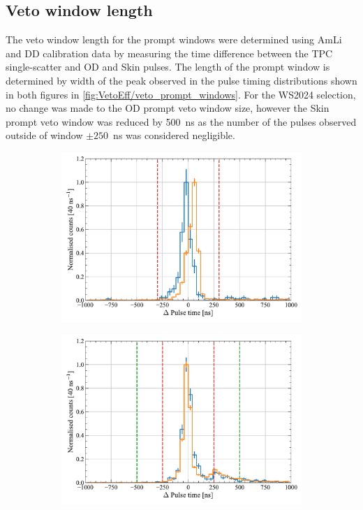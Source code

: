 \subsection{Veto window length}
The veto window length for the prompt windows were determined using AmLi and DD calibration data by measuring the time difference between the TPC single-scatter and OD and Skin pulses. The length of the prompt window is determined by width of the peak observed in the pulse timing distributions shown in both figures in \autoref{fig:VetoEff/veto_prompt_windows}. For the WS2024 selection, no change was made to the OD prompt veto window size, however the Skin prompt veto window was reduced by 500~ns as the number of the pulses observed outside of window $\pm250$~ns was considered negligible.
\begin{figure}[!ht]
	\centering
	\begin{subfigure}[b]{0.48\textwidth}
		\centering
		\includegraphics[width=\textwidth]{figures/VetoEfficiency/ODpromptWindowTiming.pdf}
        \caption{}
		\label{fig:VetoEff/od_prompt_window}
	\end{subfigure}
	\hfill
	\begin{subfigure}[b]{0.48\textwidth}
		\centering
		\includegraphics[width=\textwidth]{figures/VetoEfficiency/SkinpromptWindowTiming.pdf}

\end{subfigure}
\end{figure}
